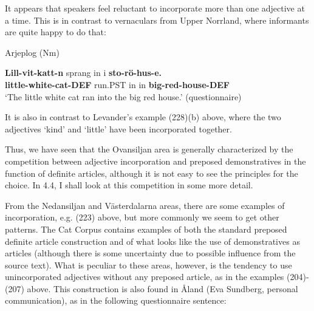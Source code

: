 \z

It appears that speakers feel reluctant to incorporate more than one adjective at a time. This is in contrast to vernaculars from Upper Norrland, where informants are quite happy to do that:


\item 

Arjeplog (Nm)



 \ea\label{}
\gll \textbf{Lill-vit-katt-n} sprang  in  i  \textbf{sto-rö-hus-e.}\\


\textbf{little-white-cat-DEF} run.PST  in  in  \textbf{big-red-house-DEF}\\

\glt ‘The little white cat ran into the big red house.’ (questionnaire)

\z

It is also in contrast to Levander’s example (228)(b) above, where the two adjectives  ‘kind’ and  ‘little’ have been incorporated together. 


Thus, we have seen that the Ovansiljan area is generally characterized by the competition between adjective incorporation and preposed demonstratives in the function of definite articles, although it is not easy to see the principles for the choice. In 4.4, I shall look at this competition in some more detail.


From the Nedansiljan and Västerdalarna areas, there are some examples of incorporation, e.g. (223) above, but more commonly we seem to get other patterns. The Cat Corpus contains examples of both the standard preposed definite article construction and of what looks like the use of demonstratives as articles (although there is some uncertainty due to possible influence from the source text). What is peculiar to these areas, however, is the tendency to use unincorporated adjectives without any preposed article, as in the examples (204){}-(207) above. This construction is also found in Åland (Eva Sundberg, personal communication), as in the following questionnaire sentence:


